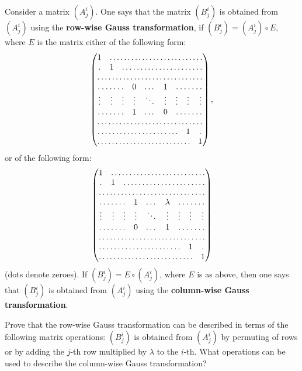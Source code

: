 \documentclass[12pt]{article}
\begin{document}
\begin{opredelenie}
  Consider a matrix $(A^i_j)$.  One says that the matrix $(B^i_j)$
  is obtained from $(A^i_j)$ using the {\bf row-wise Gauss
    transformation}, if $(B^i_j) = (A^i_j)\circ E$, where $E$ is the
 matrix either of the following form:
\begin{equation}\label{gauss.1}
\begin{pmatrix}
1 &\hdotsfor{8}\\
\hdotsfor{1} &1 &\hdotsfor{7}\\
\hdotsfor{9}\\
\hdotsfor{3} &0 &\dots &1 &\hdotsfor{3}\\
\vdots &\vdots &\vdots 
&\vdots &\ddots &\vdots 
&\vdots &\vdots &\vdots \\
\hdotsfor{3} &1 &\dots &0 &\hdotsfor{3}\\
\hdotsfor{9}\\
\hdotsfor{7} &1 &\hdotsfor{1}\\
\hdotsfor{8} &1
\end{pmatrix},
\end{equation}
or of the following form:
\begin{equation}\label{gauss.2}
\begin{pmatrix}
1 &\hdotsfor{8}\\
\hdotsfor{1} &1 &\hdotsfor{7}\\
\hdotsfor{9}\\
\hdotsfor{3} &1 &\dots &\lambda &\hdotsfor{3}\\
\vdots &\vdots &\vdots 
&\vdots &\ddots &\vdots 
&\vdots &\vdots &\vdots \\
\hdotsfor{3} &0 &\dots &1 &\hdotsfor{3}\\
\hdotsfor{9}\\
\hdotsfor{7} &1 &\hdotsfor{1}\\
\hdotsfor{8} &1
\end{pmatrix}
\end{equation}
(dots denote zeroes). 
If $(B^i_j) = E \circ (A^i_j)$, where $E$ is as above, then one says
that $(B^i_j)$ is obtained from $(A^i_j)$ using the {\bf column-wise
  Gauss transformation}.
\end{opredelenie}

\begin{zadacha} Prove that the row-wise Gauss transformation can be
described in terms of the following matrix operations: $(B^i_j)$ is
obtained from $(A^i_j)$ by permuting of rows or by adding the
$j$-th row multiplied by $\lambda$ to the $i$-th. What operations
can be used to describe the column-wise Gauss transformation?
\end{zadacha}
\end{document}
